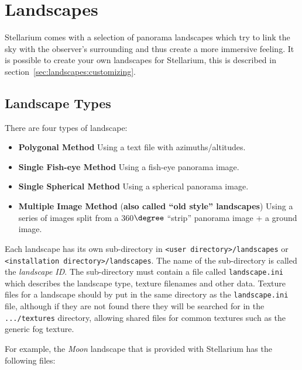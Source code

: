 
\chapter{Landscapes}\label{customising-landscapes}
\label{ch:landscapes}

Stellarium comes with a selection of panorama landscapes which try to
link the sky with the observer's surrounding and thus create a more
immersive feeling.  It is possible to create your own landscapes for
Stellarium, this is described in
section~\ref{sec:landscapes:customizing}. 

\section{Landscape Types}
\label{sec:landscapes:types}


There are four types of landscape:

\begin{itemize}
\item
  \textbf{Polygonal Method} Using a text file with azimuths/altitudes.
\item
  \textbf{Single Fish-eye Method} Using a fish-eye panorama image.
\item
  \textbf{Single Spherical Method} Using a spherical panorama image.
\item
  \textbf{Multiple Image Method} (\textbf{also called ``old style''
  landscapes}) Using a series of images split from a 360$\degree$ ``strip''
  panorama image + a ground image.
\end{itemize}

Each landscape has its own sub-directory in
\texttt{\textless{}user\ directory\textgreater{}/landscapes} or
\texttt{\textless{}installation\ directory\textgreater{}/landscapes}.
The name of the sub-directory is called the \emph{landscape ID}. The
sub-directory must contain a file called \texttt{landscape.ini} which
describes the landscape type, texture filenames and other data. Texture
files for a landscape should by put in the same directory as the
\texttt{landscape.ini} file, although if they are not found there they
will be searched for in the \texttt{.../textures} directory, allowing
shared files for common textures such as the generic fog texture.

For example, the \emph{Moon} landscape that is provided with Stellarium
has the following files:

